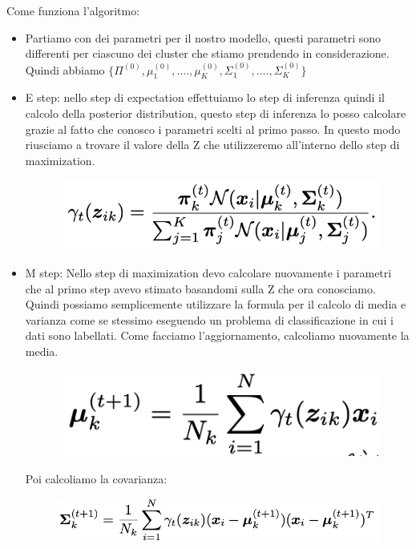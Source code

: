\documentclass[14pt]{extreport}
\begin{document}
Come funziona l'algoritmo:
\begin{itemize}
\item Partiamo con dei parametri per il nostro modello, questi parametri sono differenti per ciascuno dei cluster che stiamo prendendo in considerazione.
Quindi abbiamo $\{\Pi^{(0)}, \mu_1^{(0)},....,\mu_K^{(0)},\Sigma_1^{(0)},...., \Sigma_K^{(0)}\}$
\item E step: nello step di expectation effettuiamo lo step di inferenza quindi il calcolo della posterior distribution, questo step di inferenza 
lo posso calcolare grazie al fatto che conosco i parametri scelti al primo passo. In questo modo riusciamo a trovare il valore della Z che utilizzeremo 
all'interno dello step di maximization.	

\begin{figure}[H] 
\centering
\includegraphics[width=0.7\linewidth]{553.jpeg}
\end{figure}
\item M step: Nello step di maximization devo calcolare nuovamente i parametri che al primo step avevo stimato basandomi sulla Z che ora conosciamo. 
Quindi possiamo semplicemente utilizzare la formula per il calcolo di media e varianza come se stessimo eseguendo un problema di classificazione in cui i dati
sono labellati.
Come facciamo l'aggiornamento, calcoliamo nuovamente la media.

\begin{figure}[H] 
\centering
\includegraphics[width=0.7\linewidth]{554.jpeg}
\end{figure}

Poi calcoliamo la covarianza: 

\begin{figure}[H] 
\centering
\includegraphics[width=0.7\linewidth]{555.jpeg}
\end{figure}


\end{itemize}
\end{document}
